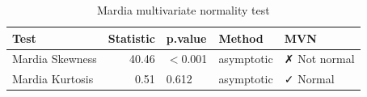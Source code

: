 \begin{table}[ht]
\centering
\begin{tabular}{lrlll}
  \toprule
Test & Statistic & p.value & Method & MVN \\
  \midrule
Mardia Skewness & 40.46 & $<$0.001 & asymptotic & ✗ Not normal \\
  Mardia Kurtosis & 0.51 & 0.612 & asymptotic & ✓ Normal \\
   \bottomrule
\end{tabular}
\caption{Mardia multivariate normality test}
\label{tab:mardia_test}
\end{table}
